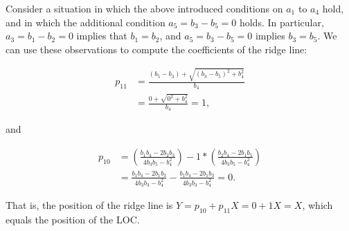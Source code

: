 \documentclass[jou,a4paper,draftfirst]{apa6}
\begin{document}
Consider a situation in which the above introduced conditions on $a_1$ to $a_4$ hold, and in which the additional condition $a_5 = b_3 - b_5 = 0$ holds. In particular, $a_3 = b_1 - b_2 = 0$ implies that $b_1 = b_2$, and $a_5 = b_3 - b_5 = 0$ implies $b_3 = b_5$. We can use these observations to compute the coefficients of the ridge line: 

\begin{align}
p_{11} &= \frac{(b_5 - b_3) + \sqrt{(b_3-b_5)^2 + b_{4}^{2}}}{b_4} \nonumber \\[0.3cm]
       &= \frac{0 + \sqrt{0^2 + b_{4}^{2}}}{b_4}  = 1 \nonumber,
\end{align}

and 

\begin{align}
p_{10} &= \left(\frac{b_1b_4 - 2b_2b_3}{4b_3b_5 - b_{4}^{2}}\right) - 1* \left( \frac{b_2b_4 - 2b_1b_5}{4b_3b_5 - b_{4}^{2}} \right) \nonumber \\[0.3cm]
       &= \frac{b_1b_4 - 2b_1b_3}{4b_3b_3 - b_{4}^{2}} - \frac{b_1b_4 - 2b_1b_3}{4b_3b_3 - b_{4}^{2}}  = 0 \nonumber.
\end{align}


That is, the position of the ridge line is $Y = p_{10} + p_{11}X = 0 + 1X = X$, which equals the position of the LOC. 
\end{document}

